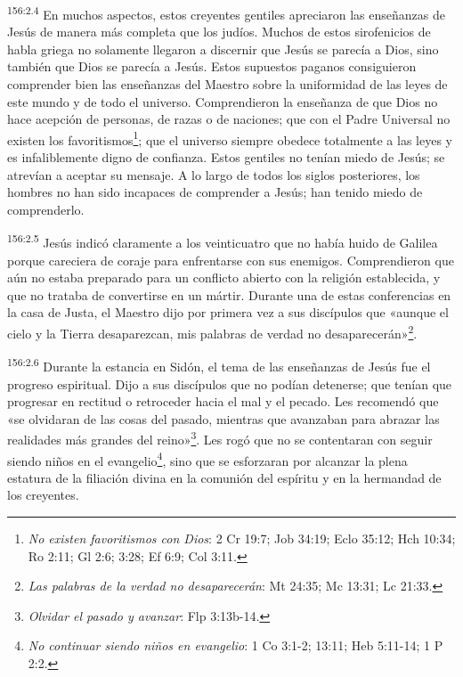 \par
\textsuperscript{156:2.4} En muchos aspectos, estos creyentes gentiles apreciaron las enseñanzas de Jesús de manera más completa que los judíos. Muchos de estos sirofenicios de habla griega no solamente llegaron a discernir que Jesús se parecía a Dios, sino también que Dios se parecía a Jesús. Estos supuestos paganos consiguieron comprender bien las enseñanzas del Maestro sobre la uniformidad de las leyes de este mundo y de todo el universo. Comprendieron la enseñanza de que Dios no hace acepción de personas, de razas o de naciones; que con el Padre Universal no existen los favoritismos\footnote{\textit{No existen favoritismos con Dios}: 2 Cr 19:7; Job 34:19; Eclo 35:12; Hch 10:34; Ro 2:11; Gl 2:6; 3:28; Ef 6:9; Col 3:11.}; que el universo siempre obedece totalmente a las leyes y es infaliblemente digno de confianza. Estos gentiles no tenían miedo de Jesús; se atrevían a aceptar su mensaje. A lo largo de todos los siglos posteriores, los hombres no han sido incapaces de comprender a Jesús; han tenido miedo de comprenderlo.

\par
\textsuperscript{156:2.5} Jesús indicó claramente a los veinticuatro que no había huido de Galilea porque careciera de coraje para enfrentarse con sus enemigos. Comprendieron que aún no estaba preparado para un conflicto abierto con la religión establecida, y que no trataba de convertirse en un mártir. Durante una de estas conferencias en la casa de Justa, el Maestro dijo por primera vez a sus discípulos que «aunque el cielo y la Tierra desaparezcan, mis palabras de verdad no desaparecerán»\footnote{\textit{Las palabras de la verdad no desaparecerán}: Mt 24:35; Mc 13:31; Lc 21:33.}.

\par
\textsuperscript{156:2.6} Durante la estancia en Sidón, el tema de las enseñanzas de Jesús fue el progreso espiritual. Dijo a sus discípulos que no podían detenerse; que tenían que progresar en rectitud o retroceder hacia el mal y el pecado. Les recomendó que «se olvidaran de las cosas del pasado, mientras que avanzaban para abrazar las realidades más grandes del reino»\footnote{\textit{Olvidar el pasado y avanzar}: Flp 3:13b-14.}. Les rogó que no se contentaran con seguir siendo niños en el evangelio\footnote{\textit{No continuar siendo niños en evangelio}: 1 Co 3:1-2; 13:11; Heb 5:11-14; 1 P 2:2.}, sino que se esforzaran por alcanzar la plena estatura de la filiación divina en la comunión del espíritu y en la hermandad de los creyentes.

